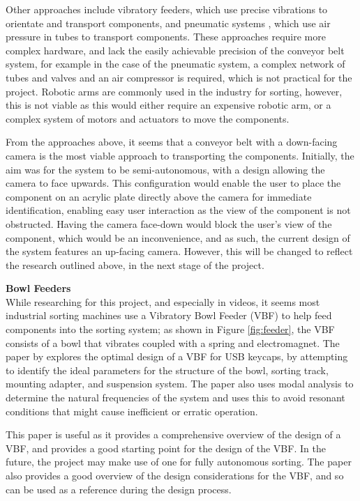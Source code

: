 Other approaches include vibratory feeders\cite{s21217280}, which use precise vibrations to orientate and transport components, and pneumatic systems \cite{ASEC2023-16267}, which use air pressure in tubes to transport components.
These approaches require more complex hardware, and lack the easily achievable precision of the conveyor belt system, for example in the case of the pneumatic system, a complex network of tubes and valves and an air compressor
is required, which is not practical for the project. Robotic arms are commonly used in the industry for sorting, however, this is not viable as this would either require an expensive robotic arm, or a complex system of motors and actuators to move the components.

From the approaches above, it seems that a conveyor belt with a down-facing camera is the most viable approach to transporting the components. Initially, the aim was for the system to be semi-autonomous, with a design allowing the camera to face upwards.
This configuration would enable the user to place the component on an acrylic plate directly above the camera for immediate identification, enabling easy user interaction as the view of the component is not obstructed. 
Having the camera face-down would block the user's view of the component, which would be an inconvenience, and as such, the current design of the system features an up-facing camera. However, 
this will be changed to reflect the research outlined above, in the next stage of the project.

\noindent
\textbf{Bowl Feeders} \\
While researching for this project, and especially in videos\cite{videobowlfeeder}, it seems most industrial sorting machines use a Vibratory Bowl Feeder (VBF) to help feed components into the sorting system;
as shown in Figure \ref*{fig:feeder}, the VBF consists of a bowl that vibrates coupled with a spring and electromagnet.
The paper by \citet{nam2019design} explores the optimal design of a VBF for USB keycaps, by attempting to identify the ideal parameters for the structure of the bowl,
sorting track, mounting adapter, and suspension system. The paper also uses modal analysis to determine the natural frequencies of the system and uses this to
avoid resonant conditions that might cause inefficient or erratic operation.

This paper is useful as it provides a comprehensive overview of the design of a VBF, and provides a good starting point for the design of the VBF. In the future,
the project may make use of one for fully autonomous sorting. The paper also provides a good overview of the design considerations for the VBF, and so can be used as a reference
during the design process.

